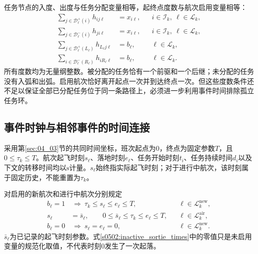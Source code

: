 任务节点的入度、出度与任务分配变量相等，起终点度数与航次启用变量相等：
\begin{align}
 \sum_{j\in\mathcal D_\ell^+(i)}h_{ij\ell}
 &=x_{i\ell},
 &&i\in\mathcal I_k,\ \ell\in\mathcal L_k,
 \label{s0502:task_outdegree}\\
 \sum_{j\in\mathcal D_\ell^-(i)}h_{ji\ell}
 &=x_{i\ell},
 &&i\in\mathcal I_k,\ \ell\in\mathcal L_k,
 \label{s0502:task_indegree}\\
 \sum_{j\in\mathcal D_\ell^+(L_\ell)}h_{L_\ell j\ell}
 &=b_\ell,
 &&\ell\in\mathcal L_k,
 \label{s0502:start_degree}\\
 \sum_{i\in\mathcal D_\ell^-(R_\ell)}h_{iR_\ell\ell}
 &=b_\ell,
 &&\ell\in\mathcal L_k.
 \label{s0502:end_degree}
\end{align}
所有度数均为无量纲整数。被分配的任务恰有一个前驱和一个后继；未分配的任务没有入弧和出弧。启用航次恰好离开起点一次并到达终点一次。但这些度数条件还不足以保证全部已分配任务位于同一条路径上，必须进一步利用事件时间排除孤立任务环。

\subsection{事件时钟与相邻事件的时间连接}

采用第\ref{sec:04_03}节的共同时间坐标，班次起点为$0$，终点为固定参数$T$，且$0\le\tau_k\le T$。航次起飞时刻$s_\ell$、落地时刻$e_\ell$、任务开始时刻$t_i$、任务持续时间$d_i$以及下文的转移时间均以$\mathrm{s}$计量。$s_\ell$始终指实际起飞时刻；对于进行中航次，该时刻属于固定历史，不能重置为$\tau_k$。

对启用的新航次和进行中航次分别规定
\begin{align}
 b_\ell=1&\ \Longrightarrow\ 
 \tau_k\le s_\ell\le e_\ell\le T,
 &&\ell\in\mathcal L_k^{\mathrm{new}},
 \label{s0502:new_time_domain}\\
 s_\ell&=\bar s_\ell,\qquad
 0\le\bar s_\ell\le\tau_k\le e_\ell\le T,
 &&\ell\in\mathcal L_k^{\mathrm{air}},
 \label{s0502:ongoing_time_domain}\\
 b_\ell=0&\ \Longrightarrow\ s_\ell=e_\ell=0,
 &&\ell\in\mathcal L_k^{\mathrm{new}}.
 \label{s0502:inactive_sortie_times}
\end{align}
$\bar s_\ell$为已记录的起飞时刻参数。式\eqref{s0502:inactive_sortie_times}中的零值只是未启用变量的规范化取值，不代表时刻$0$发生了一次起落。

